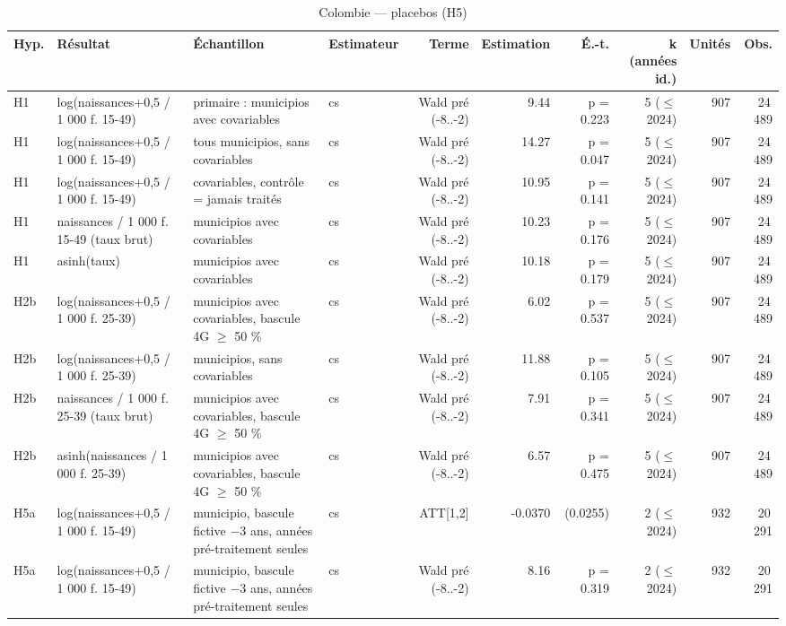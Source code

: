 \begin{table}\centering
\begin{threeparttable}
\caption{Colombie — placebos (H5)}\label{tab:co_placebo}
\scriptsize
\begin{tabular}{lp{5.0cm}p{6.4cm}lrrrrrr}
\toprule
Hyp. & Résultat & Échantillon & Estimateur & Terme & Estimation & É.-t. & k (années id.) & Unités & Obs. \\
\midrule
H1 & log(naissances+0,5 / 1 000 f. 15-49) & primaire : municipios avec covariables & cs & Wald pré (-8..-2) & 9.44 & p = 0.223 & 5 ($\leq$ 2024) & 907 & 24\,489 \\
H1 & log(naissances+0,5 / 1 000 f. 15-49) & tous municipios, sans covariables & cs & Wald pré (-8..-2) & 14.27 & p = 0.047 & 5 ($\leq$ 2024) & 907 & 24\,489 \\
H1 & log(naissances+0,5 / 1 000 f. 15-49) & covariables, contrôle = jamais traités & cs & Wald pré (-8..-2) & 10.95 & p = 0.141 & 5 ($\leq$ 2024) & 907 & 24\,489 \\
H1 & naissances / 1 000 f. 15-49 (taux brut) & municipios avec covariables & cs & Wald pré (-8..-2) & 10.23 & p = 0.176 & 5 ($\leq$ 2024) & 907 & 24\,489 \\
H1 & asinh(taux) & municipios avec covariables & cs & Wald pré (-8..-2) & 10.18 & p = 0.179 & 5 ($\leq$ 2024) & 907 & 24\,489 \\
H2b & log(naissances+0,5 / 1 000 f. 25-39) & municipios avec covariables, bascule 4G $\geq$ 50 \% & cs & Wald pré (-8..-2) & 6.02 & p = 0.537 & 5 ($\leq$ 2024) & 907 & 24\,489 \\
H2b & log(naissances+0,5 / 1 000 f. 25-39) & municipios, sans covariables & cs & Wald pré (-8..-2) & 11.88 & p = 0.105 & 5 ($\leq$ 2024) & 907 & 24\,489 \\
H2b & naissances / 1 000 f. 25-39 (taux brut) & municipios avec covariables, bascule 4G $\geq$ 50 \% & cs & Wald pré (-8..-2) & 7.91 & p = 0.341 & 5 ($\leq$ 2024) & 907 & 24\,489 \\
H2b & asinh(naissances / 1 000 f. 25-39) & municipios avec covariables, bascule 4G $\geq$ 50 \% & cs & Wald pré (-8..-2) & 6.57 & p = 0.475 & 5 ($\leq$ 2024) & 907 & 24\,489 \\
H5a & log(naissances+0,5 / 1 000 f. 15-49) & municipio, bascule fictive $-$3 ans, années pré-traitement seules & cs & ATT[1,2] & -0.0370 & (0.0255) & 2 ($\leq$ 2024) & 932 & 20\,291 \\
H5a & log(naissances+0,5 / 1 000 f. 15-49) & municipio, bascule fictive $-$3 ans, années pré-traitement seules & cs & Wald pré (-8..-2) & 8.16 & p = 0.319 & 2 ($\leq$ 2024) & 932 & 20\,291 \\

\end{tabular}
\end{threeparttable}
\end{table}
